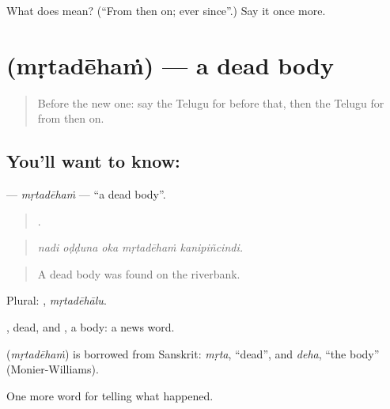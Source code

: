 \begin{tcolorbox}[breakable,colback=teal!4,colframe=teal!35!black,title={Before you move on}]
What does  mean? (\textquotedblleft{}From then on; ever since\textquotedblright{}.) Say it once more.
\end{tcolorbox}
\section[\texorpdfstring{\te{మృతదేహం} (mṛtadēhaṁ)}{మృతదేహం (mṛtadēhaṁ)}]{ (mṛtadēhaṁ) — a dead body}

\label{lesson:TE-C380-mrtadeham}



\begin{quote}
Before the new one: say the Telugu for before that, then the Telugu for from then on.
\end{quote}

\subsection*{You'll want to know: }
\textbf{} — \emph{mṛtadēhaṁ} — \textquotedblleft{}a dead body\textquotedblright{}.

\begin{quote}
    .
\end{quote}

\begin{quote}
\emph{nadi oḍḍuna oka mṛtadēhaṁ kanipiñcindi.}
\end{quote}

\begin{quote}
A dead body was found on the riverbank.
\end{quote}

Plural: , \emph{mṛtadēhālu}.

, dead, and , a body: a news word.

\begin{cousinweb}
\textbf{} (\emph{mṛtadēhaṁ}) is borrowed from Sanskrit: \emph{mṛta}, \textquotedblleft{}dead\textquotedblright{}, and \emph{deha}, \textquotedblleft{}the body\textquotedblright{} (Monier-Williams).
\end{cousinweb}

\begin{grammarlens}[title={What you've built}]
One more word for telling what happened.
\end{grammarlens}


